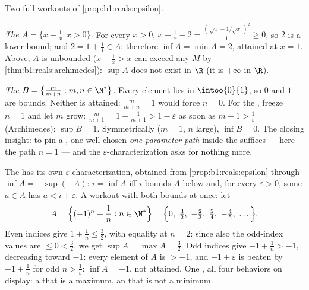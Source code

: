 \begin{example}\label{ex:b1:reals:supcompute}
Two full workouts of \cref{prop:b1:reals:epsilon}.

\emph{The  $A = \{x + \frac1x : x > 0\}$.} For every $x > 0$,
$x + \frac1x - 2 = \frac{(\,\sqrt x - 1/\sqrt x\,)^2}{1} \geq 0$,
so $2$ is a lower bound; and $2 = 1 + \frac11 \in A$: therefore
$\inf A = \min A = 2$, attained at $x = 1$. Above, $A$ is
unbounded ($x + \frac1x > x$ can exceed any $M$ by
\cref{thm:b1:reals:archimedes}): $\sup A$ does not exist in $\R$
(it is $+\infty$ in $\overline\R$).

\emph{The  $B = \bigl\{\frac{m}{m + n} : m, n \in
\N^*\bigr\}$.} Every element lies in $\intoo{0}{1}$, so $0$ and
$1$ are bounds. Neither is attained: $\frac{m}{m+n} = 1$ would
force $n = 0$. For the , freeze $n = 1$ and let $m$ grow:
$\frac{m}{m+1} = 1 - \frac{1}{m+1} > 1 - \varepsilon$ as soon as
$m + 1 > \frac1\varepsilon$ (Archimedes): $\sup B = 1$.
Symmetrically ($m = 1$, $n$ large), $\inf B = 0$. The closing
insight: to pin a , one well-chosen \emph{one-parameter
path} inside the  suffices --- here the path $n = 1$ --- and
the $\varepsilon$-characterization asks for nothing more.
\end{example}

\begin{example}\label{ex:b1:reals:infmirror}
The  has its own $\varepsilon$-characterization, obtained
from \cref{prop:b1:reals:epsilon} through $\inf A = -\sup(-A)$:
$i = \inf A$ iff $i$ bounds $A$ below and, for every
$\varepsilon > 0$, some $a \in A$ has $a < i + \varepsilon$. A
workout with both bounds at once: let
\[
A = \Bigl\{(-1)^n + \frac1n : n \in \N^*\Bigr\}
= \Bigl\{0,\ \tfrac32,\ -\tfrac23,\ \tfrac54,\ -\tfrac45,\
\dots\Bigr\} .
\]
Even indices give $1 + \frac1n \leq \frac32$, with equality at
$n = 2$: since also the odd-index values are $\leq 0 <
\frac32$, we get $\sup A = \max A = \frac32$. Odd indices give
$-1 + \frac1n > -1$, decreasing toward $-1$: every element of
$A$ is $> -1$, and $-1 + \varepsilon$ is beaten by $-1 +
\frac1n$ for odd $n > \frac1\varepsilon$: $\inf A = -1$, not
attained. One , all four behaviors on display: a 
that is a maximum, an \omterm{def:b1:reals:bounds}{infimum} that is not a minimum.
\end{example}


